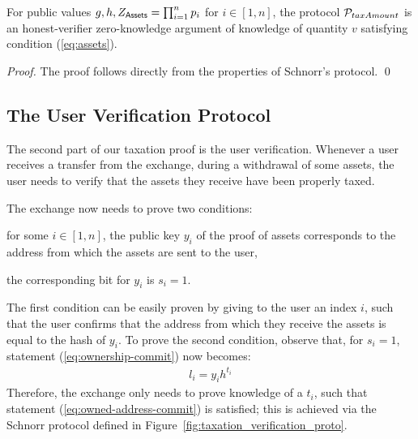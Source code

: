\begin{theorem}
    For public values $g, h, Z_{\mathsf{Assets}} = \prod_{i = 1}^n p_i$ for $i \in [1,
    n]$, the protocol $\mathcal{P}_{taxAmount}$ is an honest-verifier zero-knowledge
    argument of knowledge of quantity $v$ satisfying condition (\ref{eq:assets}).
\end{theorem}
\begin{proof}
    The proof follows directly from the properties of Schnorr's protocol. \qed
\end{proof}

\subsection{The User Verification Protocol}\label{subsec:user-verification-proto}

The second part of our taxation proof is the user verification. Whenever a user
receives a transfer from the exchange, \eg during a withdrawal of some assets,
the user needs to verify that the assets they receive have been properly taxed.

The exchange now needs to prove two conditions:
\begin{inparaenum}[i)]
    \item for some $i \in [1, n]$, the public key $y_i$ of the proof of assets
        corresponds to the address from which the assets are sent to the user,
    \item the corresponding bit for $y_i$ is $s_i = 1$.
\end{inparaenum}
The first condition can be easily proven by giving to the user an index $i$,
such that the user confirms that the address from which they receive the assets
is equal to the hash of $y_i$. To prove the second condition, observe that, for
$s_i = 1$, statement (\ref{eq:ownership-commit}) now becomes:
\begin{align}
    l_i = y_ih^{t_i} \label{eq:owned-address-commit}
\end{align}
Therefore, the exchange only needs to prove knowledge of a $t_i$, such that
statement (\ref{eq:owned-address-commit}) is satisfied; this is achieved via
the Schnorr protocol defined in Figure~\ref{fig:taxation_verification_proto}.

